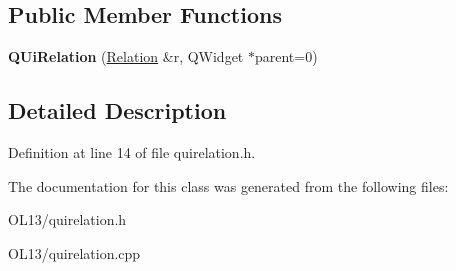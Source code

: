 \subsection*{Public Member Functions}
\begin{DoxyCompactItemize}
\item 
\mbox{\label{class_q_ui_relation_a4d31962371f2008d814958cdf3810e14}} 
{\bfseries Q\+Ui\+Relation} (\hyperlink{class_relation}{Relation} \&r, Q\+Widget $\ast$parent=0)
\end{DoxyCompactItemize}


\subsection{Detailed Description}


Definition at line 14 of file quirelation.\+h.



The documentation for this class was generated from the following files\+:\begin{DoxyCompactItemize}
\item 
O\+L13/quirelation.\+h\item 
O\+L13/quirelation.\+cpp\end{DoxyCompactItemize}
